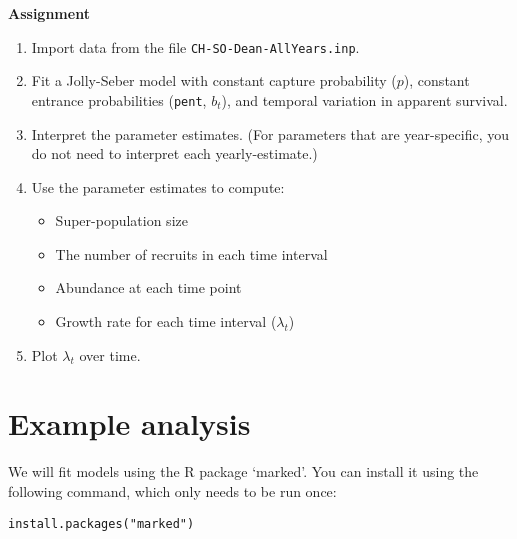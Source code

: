 \documentclass[12pt]{article}\usepackage[]{graphicx}\usepackage[]{color}
\makeatletter
\newcommand{\hlstr}[1]{\textcolor[rgb]{0.749,0.012,0.012}{#1}}%
\newcommand{\hlstd}[1]{\textcolor[rgb]{0,0,0}{#1}}%
\newcommand{\hlkwd}[1]{\textcolor[rgb]{0.004,0.004,0.506}{#1}}%
\newenvironment{kframe}{%
 \def\at@end@of@kframe{}%
 \ifinner\ifhmode%
  \def\at@end@of@kframe{\end{minipage}}%
  \begin{minipage}{\columnwidth}%
 \fi\fi%
 \def\FrameCommand##1{\hskip\@totalleftmargin \hskip-\fboxsep
 \colorbox{shadecolor}{##1}\hskip-\fboxsep
     \hskip-\linewidth \hskip-\@totalleftmargin \hskip\columnwidth}%
 \MakeFramed {\advance\hsize-\width
   \@totalleftmargin\z@ \linewidth\hsize
   \@setminipage}}%
 {\par\unskip\endMakeFramed%
 \at@end@of@kframe}
\newenvironment{knitrout}{}{} %
\makeatother
\begin{document}

{\bf Assignment}

\begin{enumerate}
  \item Import data from the file \texttt{CH-SO-Dean-AllYears.inp}.
  \item Fit a Jolly-Seber model with constant capture probability
    ($p$), constant entrance probabilities (\texttt{pent}, $b_t$), and
    temporal variation in apparent survival.
  \item Interpret the parameter estimates. (For parameters that are
    year-specific, you do not need to interpret each yearly-estimate.) 
  \item Use the parameter estimates to compute:
    \begin{itemize}
      \item Super-population size
      \item The number of recruits in each time interval
      \item Abundance at each time point
      \item Growth rate for each time interval ($\lambda_t$)
    \end{itemize}
  \item Plot $\lambda_t$ over time.
\end{enumerate}


\clearpage

\section*{Example analysis}




We will fit models using the R package `marked'. You can install it
using the following command, which only needs to be run once: 

\begin{knitrout}
\color{fgcolor}\begin{kframe}
\begin{alltt}
\hlkwd{install.packages}\hlstd{(}\hlstr{"marked"}\hlstd{)}
\end{alltt}
\end{kframe}
\end{knitrout}
\end{document}
